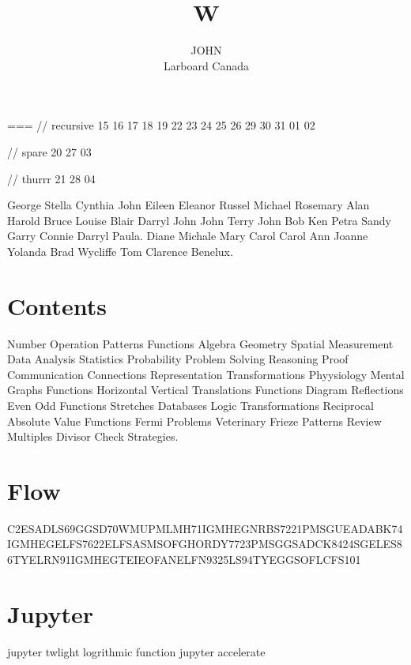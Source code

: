 \documentclass{textbook}
\title{W}
\author{
  \parbox{0.3\linewidth}{\centering JOHN\\Larboard Canada}
  }
\begin{document}
\maketitle

                                                        ===
// recursive
15 16 17 18 19
22 23 24 25 26
29 30 31 01 02

// spare
20
27
03

// thurrr
21
28
04

George Stella Cynthia John Eileen Eleanor Russel Michael Rosemary Alan Harold Bruce Louise Blair Darryl John John Terry John Bob Ken Petra Sandy Garry Connie Darryl Paula. Diane Michale Mary Carol Carol Ann Joanne Yolanda Brad Wycliffe Tom Clarence Benelux.

\section{Contents}

Number Operation Patterns Functions Algebra Geometry Spatial Measurement Data Analysis Statistics Probability Problem Solving Reasoning Proof Communication Connections Representation Transformations Phyysiology Mental Graphs Functions Horizontal Vertical Translations Functions Diagram Reflections Even Odd Functions Stretches Databases Logic Transformations Reciprocal Absolute Value Functions Fermi Problems Veterinary Frieze Patterns Review Multiples Divisor Check Strategies.

\section{Flow}
C2ESADLS69GGSD70WMUPMLMH71IGMHEGNRBS7221PMSGUEADABK74IGMHEGELFS7622ELFSASMSOFGHORDY7723PMSGGSADCK8424SGELES86TYELRN91IGMHEGTEIEOFANELFN9325LS94TYEGGSOFLCFS101

\section{Jupyter}
jupyter twlight logrithmic function
jupyter accelerate
\end{document}
